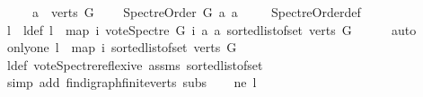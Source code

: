 \begin{isabellebody}
\ \ \ \ \ {\isachardoublequoteopen}a\ {\isasymin}\ verts\ G{\isachardoublequoteclose}\ \isanewline
\ \ \ {\isachardoublequoteopen}Spectre{\isacharunderscore}{\kern0pt}Order\ G\ a\ a{\isachardoublequoteclose}\ \isanewline
%
\isadelimproof
\ \ %
\endisadelimproof
%
\isatagproof
{}\isamarkupfalse%
\ Spectre{\isacharunderscore}{\kern0pt}Order{\isacharunderscore}{\kern0pt}def\ \isanewline
{}\isamarkupfalse%
\ {\isacharminus}{\kern0pt}\ \ \ \isanewline
\ \ \isamarkupfalse%
\ l\ \ l{\isacharunderscore}{\kern0pt}def{\isacharcolon}{\kern0pt}\ {\isachardoublequoteopen}l\ {\isacharequal}{\kern0pt}\ {\isacharparenleft}{\kern0pt}map\ {\isacharparenleft}{\kern0pt}{\isasymlambda}i{\isachardot}{\kern0pt}\ vote{\isacharunderscore}{\kern0pt}Spectre\ G\ i\ a\ a{\isacharparenright}{\kern0pt}\ {\isacharparenleft}{\kern0pt}sorted{\isacharunderscore}{\kern0pt}list{\isacharunderscore}{\kern0pt}of{\isacharunderscore}{\kern0pt}set\ {\isacharparenleft}{\kern0pt}verts\ G{\isacharparenright}{\kern0pt}{\isacharparenright}{\kern0pt}{\isacharparenright}{\kern0pt}{\isachardoublequoteclose}\isanewline
\ \ \ \ \isamarkupfalse%
\ auto\isanewline
\ \ \isamarkupfalse%
\ only{\isacharunderscore}{\kern0pt}one{\isacharcolon}{\kern0pt}\ {\isachardoublequoteopen}l\ {\isacharequal}{\kern0pt}\ {\isacharparenleft}{\kern0pt}map\ {\isacharparenleft}{\kern0pt}{\isasymlambda}i{\isachardot}{\kern0pt}{}{\isacharparenright}{\kern0pt}\ {\isacharparenleft}{\kern0pt}sorted{\isacharunderscore}{\kern0pt}list{\isacharunderscore}{\kern0pt}of{\isacharunderscore}{\kern0pt}set\ {\isacharparenleft}{\kern0pt}verts\ G{\isacharparenright}{\kern0pt}{\isacharparenright}{\kern0pt}{\isacharparenright}{\kern0pt}{\isachardoublequoteclose}\isanewline
\ \ \ \ \isamarkupfalse%
\ l{\isacharunderscore}{\kern0pt}def\ vote{\isacharunderscore}{\kern0pt}Spectre{\isacharunderscore}{\kern0pt}reflexive\ assms\ sorted{\isacharunderscore}{\kern0pt}list{\isacharunderscore}{\kern0pt}of{\isacharunderscore}{\kern0pt}set{\isacharparenleft}{\kern0pt}{}{\isacharparenright}{\kern0pt}\isanewline
\ \ \ \ \isamarkupfalse%
\ {\isacharparenleft}{\kern0pt}simp\ add{\isacharcolon}{\kern0pt}\ fin{\isacharunderscore}{\kern0pt}digraph{\isachardot}{\kern0pt}finite{\isacharunderscore}{\kern0pt}verts\ subs{\isacharparenright}{\kern0pt}\isanewline
\ \ \isamarkupfalse%
\ ne{\isacharcolon}{\kern0pt}\ {\isachardoublequoteopen}l\ {\isasymnoteq}\ {\isacharbrackleft}{\kern0pt}{\isacharbrackright}{\kern0pt}{\isachardoublequoteclose}\isanewline

\end{isabellebody}
